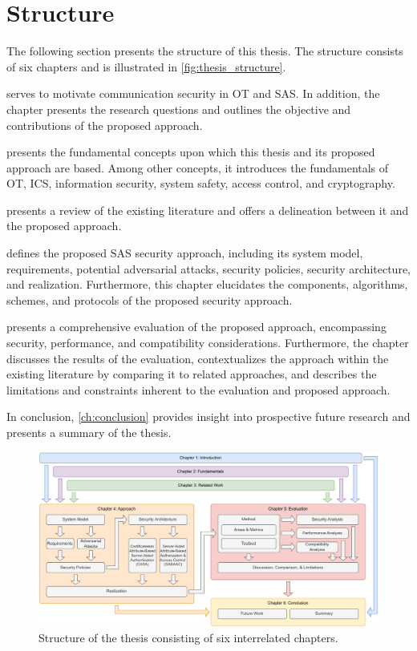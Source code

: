 \section{Structure}
\label{sec:introduction:structure}
The following section presents the structure of this thesis.
The structure consists of six chapters and is illustrated in \autoref{fig:thesis_structure}.

 serves to motivate communication security in OT and SAS.
In addition, the chapter presents the research questions and outlines the objective and contributions of the proposed approach.

 presents the fundamental concepts upon which this thesis and its proposed approach are based.
Among other concepts, it introduces the fundamentals of OT, ICS, information security, system safety, access control, and cryptography.

 presents a review of the existing literature and offers a delineation between it and the proposed approach.

 defines the proposed SAS security approach, including its system model, requirements, potential adversarial attacks, security policies, security architecture, and realization.
Furthermore, this chapter elucidates the components, algorithms, schemes, and protocols of the proposed security approach.

 presents a comprehensive evaluation of the proposed approach, encompassing security, performance, and compatibility considerations.
Furthermore, the chapter discusses the results of the evaluation, contextualizes the approach within the existing literature by comparing it to related approaches, and describes the limitations and constraints inherent to the evaluation and proposed approach.

In conclusion, \cref{ch:conclusion} provides insight into prospective future research and presents a summary of the thesis.
\begin{figure}
    \centering
    \includegraphics[width=1.\linewidth]{figures/thesis_structure.drawio.pdf}
    \caption{Structure of the thesis consisting of six interrelated chapters.}
    \label{fig:thesis_structure}
\end{figure}
